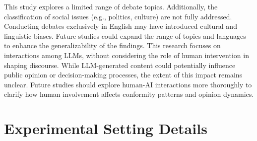 \documentclass[11pt]{article}
\begin{document}
This study explores a limited range of debate topics. Additionally, the classification of social issues (e.g., politics, culture) are not fully addressed. Conducting debates exclusively in English may have introduced cultural and linguistic biases. Future studies could expand the range of topics and languages to enhance the generalizability of the findings.
This research focuses on interactions among LLMs, without considering the role of human intervention in shaping discourse. While LLM-generated content could potentially influence public opinion or decision-making processes, the extent of this impact remains unclear. Future studies should explore human-AI interactions more thoroughly to clarify how human involvement affects conformity patterns and opinion dynamics.




%


\appendix


\section{Experimental Setting Details}
\label{sec:appendix_A}
\end{document}
